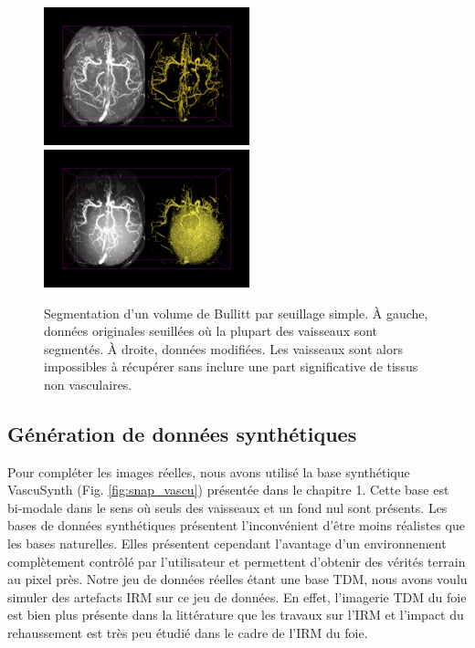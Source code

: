 \begin{figure}[!ht]
  \centering
  \includegraphics[height=4cm]{Images/threshold_bullitt.png}
  \includegraphics[height=4cm]{Images/threshold_bullitt_difficult.png}
  \caption{Segmentation d'un volume de Bullitt par seuillage simple. À gauche, données originales seuillées où la plupart des vaisseaux sont segmentés. À droite, données modifiées. Les vaisseaux sont alors impossibles à récupérer sans inclure une part significative de tissus non vasculaires.}
  \label{fig:modifications_bullitt}
\end{figure}

\subsection{Génération de données synthétiques}

Pour compléter les images réelles, nous avons utilisé la base synthétique VascuSynth (Fig. \ref{fig:snap_vascu}) présentée dans le chapitre 1. Cette base est bi-modale dans le sens où seuls des vaisseaux et un fond nul sont présents. Les bases de données synthétiques présentent l'inconvénient d'être moins réalistes que les bases naturelles. Elles présentent cependant l'avantage d'un environnement complètement contrôlé par l'utilisateur et permettent d'obtenir des vérités terrain au pixel près. Notre jeu de données réelles étant une base TDM, nous avons voulu simuler des artefacts IRM sur ce jeu de données. En effet, l'imagerie TDM du foie est bien plus présente dans la littérature que les travaux sur l'IRM et l'impact du rehaussement est très peu étudié dans le cadre de l'IRM du foie.

